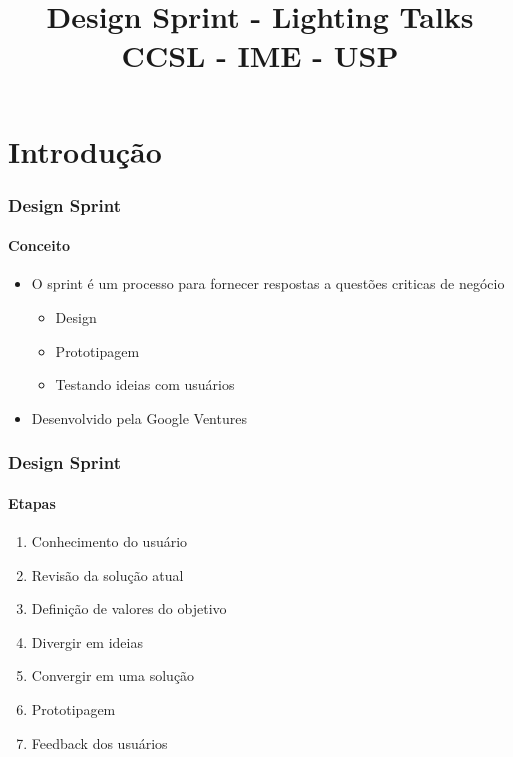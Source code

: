 \documentclass{beamer}
\title{
       \textbf{Design Sprint - Lighting Talks} \\
       CCSL - IME - USP
      }
\begin{document}
\maketitle

\section{Introdução}

\begin{frame}
  \frametitle{Design Sprint}
  \framesubtitle{Conceito}

  \begin{itemize}
    \item O sprint é um processo para fornecer respostas a questões criticas de negócio
      \begin{itemize}
        \item Design
        \vspace{.25cm}
        \item Prototipagem
        \vspace{.25cm}
        \item Testando ideias com usuários
      \end{itemize}
    \vspace{.5cm}
    \item Desenvolvido pela Google Ventures
  \end{itemize}
\end{frame}

\begin{frame}
  \frametitle{Design Sprint}
  \framesubtitle{Etapas}

  \begin{enumerate}
    \item Conhecimento do usuário
    \item Revisão da solução atual
    \item Definição de valores do objetivo
    \item Divergir em ideias
    \item Convergir em uma solução
    \item Prototipagem
    \item Feedback dos usuários
  \end{enumerate}
\end{frame}
\end{document}

